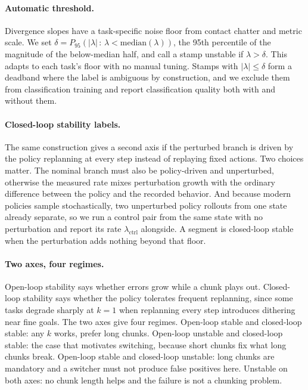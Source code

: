 

\paragraph{Automatic threshold.}
Divergence slopes have a task-specific noise floor from contact chatter and
metric scale. We set
$\delta = P_{95}\left(\lvert \lambda \rvert \,:\, \lambda < \mathrm{median}(\lambda)\right)$,
the 95th percentile of the magnitude of the below-median half, and call a stamp
unstable if $\lambda > \delta$. This adapts to each task's floor with no manual
tuning. Stamps with $\lvert \lambda \rvert \le \delta$ form a deadband where
the label is ambiguous by construction, and we exclude them from
classification training and report classification quality both with and
without them.

\paragraph{Closed-loop stability labels.}
The same construction gives a second axis if the perturbed branch is driven by
the policy replanning at every step instead of replaying fixed actions. Two
choices matter. The nominal branch must also be policy-driven and unperturbed,
otherwise the measured rate mixes perturbation growth with the ordinary
difference between the policy and the recorded behavior. And because modern
policies sample stochastically, two unperturbed policy rollouts from one state
already separate, so we run a control pair from the same state with no
perturbation and report its rate $\lambda_{\text{ctrl}}$ alongside. A segment
is closed-loop stable when the perturbation adds nothing beyond that floor.

\paragraph{Two axes, four regimes.}
Open-loop stability says whether errors grow while a chunk plays out.
Closed-loop stability says whether the policy tolerates frequent replanning,
since some tasks degrade sharply at $k{=}1$ when replanning every step
introduces dithering near fine goals. The two axes give four regimes.
Open-loop stable and closed-loop stable: any $k$ works, prefer long chunks.
Open-loop unstable and closed-loop stable: the case that motivates switching,
because short chunks fix what long chunks break.
Open-loop stable and closed-loop unstable: long chunks are mandatory and a
switcher must not produce false positives here.
Unstable on both axes: no chunk length helps and the failure is not a chunking
problem.

